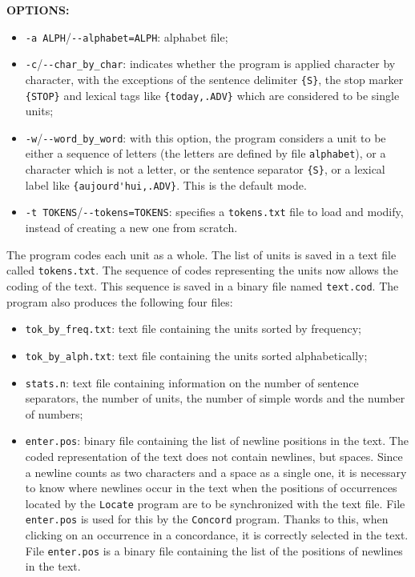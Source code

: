 \bigskip
\noindent \textbf{OPTIONS:}
\begin{itemize}
  \item \verb+-a ALPH+/\verb+--alphabet=ALPH+: alphabet file;
  
  \item \verb+-c+/\verb+--char_by_char+: indicates whether the program is applied character by
  character, with the exceptions of the sentence delimiter \verb+{S}+,
  the stop marker \verb+{STOP}+ and lexical tags like \verb+{today,.ADV}+ which
  are considered to be single units;

 \item \verb+-w+/\verb+--word_by_word+: with this option, the program
  considers a unit to be either a sequence of letters (the letters are defined
  by file \verb+alphabet+), or a character which is not a letter, or the
  sentence separator \verb+{S}+, or a lexical label 
  like \verb+{aujourd'hui,.ADV}+. 
   This is the default mode.

 \item \verb+-t TOKENS+/\verb+--tokens=TOKENS+: specifies a \verb+tokens.txt+
 file to load and modify, instead of creating a new one from scratch.
\end{itemize}


\bigskip
\noindent The program codes each unit as a whole. The list of units is saved in a text file
called \verb+tokens.txt+. The sequence of codes representing the units now allows
the coding of the text. This sequence is saved in a binary file named
\verb+text.cod+. The program also produces the following four files:

\begin{itemize}
  \item \verb+tok_by_freq.txt+: text file containing the units sorted by frequency;
  \item \verb+tok_by_alph.txt+: text file containing the units sorted alphabetically;
  \item \verb+stats.n+: text file containing information on the number of
  sentence separators, the number of units, the number of simple words and the
  number of numbers;

  \item \verb+enter.pos+: binary file containing the list of newline positions in
  the text. The coded representation of the text does not contain newlines, but
  spaces. Since a newline counts as two characters and a space as a single one,
  it is necessary to know where newlines occur in the text when the positions of
  occurrences located by the \verb+Locate+ program are to be synchronized with
  the text file. File \verb+enter.pos+ is used for this by the \verb+Concord+
  program. Thanks to this, when clicking on an occurrence in a concordance, it is
  correctly selected in the text. File \verb$enter.pos$ is a binary file
  containing the list of the positions of newlines in the text.

\end{itemize}

